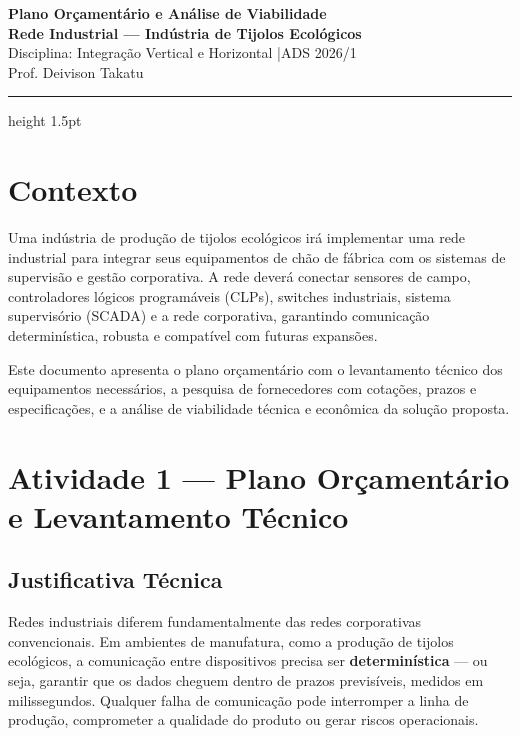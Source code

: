 \documentclass[12pt,a4paper]{article}
\begin{document}
\begin{center}
    {\Large\bfseries\color{darkblue} Plano Orçamentário e Análise de Viabilidade}\\[4pt]
    {\large\bfseries Rede Industrial --- Indústria de Tijolos Ecológicos}\\[6pt]
    {\normalsize\textcolor{medgray}{Disciplina: Integração Vertical e Horizontal \quad|\quad ADS 2026/1}}\\[2pt]
    {\normalsize\textcolor{medgray}{Prof. Deivison Takatu}}
\end{center}

\vspace{4pt}
\hrule height 1.5pt
\vspace{14pt}

\section{Contexto}

Uma indústria de produção de tijolos ecológicos irá implementar uma rede industrial para
integrar seus equipamentos de chão de fábrica com os sistemas de supervisão e gestão
corporativa. A rede deverá conectar sensores de campo, controladores lógicos programáveis
(CLPs), switches industriais, sistema supervisório (SCADA) e a rede corporativa, garantindo
comunicação determinística, robusta e compatível com futuras expansões.

Este documento apresenta o plano orçamentário com o levantamento técnico dos equipamentos
necessários, a pesquisa de fornecedores com cotações, prazos e especificações, e a
análise de viabilidade técnica e econômica da solução proposta.

\section{Atividade 1 --- Plano Orçamentário e Levantamento Técnico}

\subsection{Justificativa Técnica}

Redes industriais diferem fundamentalmente das redes corporativas convencionais. Em
ambientes de manufatura, como a produção de tijolos ecológicos, a comunicação entre
dispositivos precisa ser \textbf{determinística} --- ou seja, garantir que os dados
cheguem dentro de prazos previsíveis, medidos em milissegundos. Qualquer falha de
comunicação pode interromper a linha de produção, comprometer a qualidade do produto
ou gerar riscos operacionais.
\end{document}
